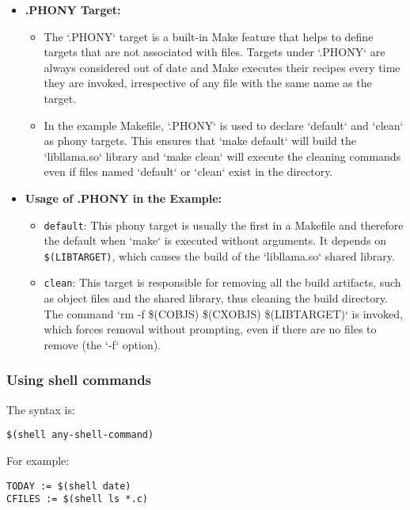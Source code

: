 \documentclass[12pt]{article}
\begin{document}
\begin{itemize}
    \item \textbf{.PHONY Target:}
    \begin{itemize}
        \item The `.PHONY` target is a built-in Make feature that helps to define targets that are not associated with files. Targets under `.PHONY` are always considered out of date and Make executes their recipes every time they are invoked, irrespective of any file with the same name as the target.
        \item In the example Makefile, `.PHONY` is used to declare `default` and `clean` as phony targets. This ensures that `make default` will build the `libllama.so` library and `make clean` will execute the cleaning commands even if files named `default` or `clean` exist in the directory.
    \end{itemize}
    
    \item \textbf{Usage of .PHONY in the Example:}
    \begin{itemize}
        \item \texttt{default}: This phony target is usually the first in a Makefile and therefore the default when `make` is executed without arguments. It depends on \texttt{\$(LIBTARGET)}, which causes the build of the `libllama.so` shared library.
        \item \texttt{clean}: This target is responsible for removing all the build artifacts, such as object files and the shared library, thus cleaning the build directory. The command `rm -f \$(COBJS) \$(CXOBJS) \$(LIBTARGET)` is invoked, which forces removal without prompting, even if there are no files to remove (the `-f` option).
    \end{itemize}
\end{itemize}

\subsubsection{Using shell commands}

The syntax is:

\begin{lstlisting}
$(shell any-shell-command)
\end{lstlisting}

For example:

\begin{lstlisting}
TODAY := $(shell date)
CFILES := $(shell ls *.c)
\end{lstlisting}
\end{document}

